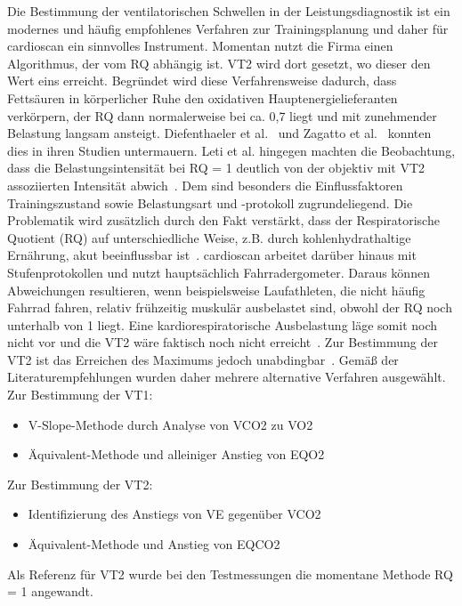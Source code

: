 Die Bestimmung der ventilatorischen Schwellen in der Leistungsdiagnostik ist ein modernes und häufig empfohlenes Verfahren zur Trainingsplanung und daher für cardioscan ein sinnvolles Instrument. Momentan nutzt die Firma einen Algorithmus, der vom RQ abhängig ist. VT2 wird dort gesetzt, wo dieser den Wert eins erreicht. Begründet wird diese Verfahrensweise dadurch, dass Fettsäuren in körperlicher Ruhe den oxidativen Hauptenergielieferanten verkörpern, der RQ dann normalerweise bei ca. 0,7 liegt und mit zunehmender Belastung langsam ansteigt. Diefenthaeler et al.~\cite{Diefenthaeler.2017} und Zagatto et al.~\cite{Zagatto.2012} konnten dies in ihren Studien untermauern. Leti et al. hingegen machten die Beobachtung, dass die Belastungsintensität bei RQ = 1 deutlich von der objektiv mit VT2 assoziierten Intensität abwich~\cite{Leti.2012}. Dem sind besonders die Einflussfaktoren Trainingszustand sowie Belastungsart und -protokoll zugrundeliegend. Die Problematik wird zusätzlich durch den Fakt verstärkt, dass der Respiratorische Quotient (\acs{RQ}) auf unterschiedliche Weise, z.B. durch kohlenhydrathaltige Ernährung, akut beeinflussbar ist~\cite{ScharhagRosenberger.2010}. cardioscan arbeitet darüber hinaus mit Stufenprotokollen und nutzt hauptsächlich Fahrradergometer. Daraus können Abweichungen resultieren, wenn beispielsweise Laufathleten, die nicht häufig Fahrrad fahren, relativ frühzeitig muskulär ausbelastet sind, obwohl der RQ noch unterhalb von 1 liegt. Eine kardiorespiratorische Ausbelastung läge somit noch nicht vor und die VT2 wäre faktisch noch nicht erreicht~\cite{Tzvetkov.2008}. Zur Bestimmung der VT2 ist das Erreichen des Maximums jedoch unabdingbar~\cite{ScharhagRosenberger.2013}. Gemäß der Literaturempfehlungen wurden daher mehrere alternative Verfahren ausgewählt.\\
Zur Bestimmung der VT1:
%
\begin{itemize}
	\item V-Slope-Methode durch Analyse von \acs{VCO2} zu \acs{VO2}
	\item Äquivalent-Methode und alleiniger Anstieg von \acs{EQO2}
\end{itemize}
%
Zur Bestimmung der VT2:
%
\begin{itemize}
	\item Identifizierung des Anstiegs von \acs{VE} gegenüber \acs{VCO2}
	\item Äquivalent-Methode und Anstieg von \acs{EQCO2}
\end{itemize}
%
Als Referenz für VT2 wurde bei den Testmessungen die momentane Methode RQ = 1 angewandt.\\
